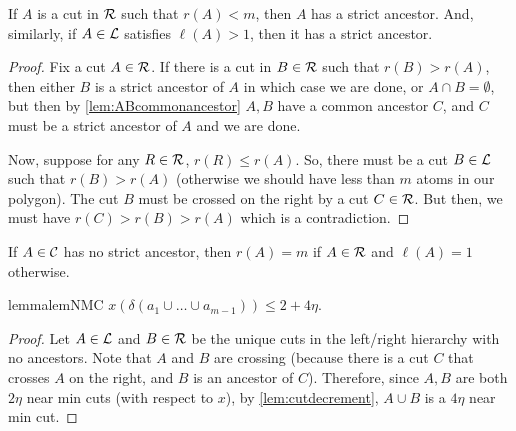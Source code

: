 \begin{lemma}\label{lem:strictparentexists}
If $A$ is a cut in ${\cal R}$ such that $r(A)<m$, then $A$ has a strict ancestor. And, similarly, if $A\in{\cal L}$ satisfies $\ell(A)>1$, then it has a strict ancestor.
\end{lemma}
\begin{proof}
Fix a cut $A\in {\cal R}$. If there is a cut in $B\in {\cal R}$ such that $r(B)>r(A)$, then either $B$ is a strict ancestor of $A$ in which case we are done, or $A\cap B=\emptyset$, but then by \cref{lem:ABcommonancestor} $A,B$ have a common ancestor $C$, and $C$ must be a strict ancestor of $A$ and we are done.

Now, suppose for any $R\in {\cal R}$, $r(R)\leq r(A)$. So, there must be a cut $B\in {\cal L}$ such that $r(B)>r(A)$ (otherwise we should have less than $m$ atoms in our polygon). The cut $B$ must be crossed on the right by a cut $C\in {\cal R}$. But then, we must have $r(C)>r(B)>r(A)$ which is a contradiction. 
\end{proof}


\begin{corollary}\label{cor:leftmostrightmostancestor}
	If $A\in {\cal C}$ has no strict ancestor, then $r(A)=m$ if $A\in {\cal R}$ and $\ell(A)=1$ otherwise.
\end{corollary}


\begin{restatable}{lemma}{lemNMC}\label{lem:NMC}
$x(\delta(a_1\cup\dots\cup a_{m-1}))\leq 2+4\eta.$ 
\end{restatable}
\begin{proof}
	Let $A\in {\cal L}$ and $B\in {\cal R}$ be the unique cuts in the left/right  hierarchy with no ancestors. Note that $A$ and $B$ are crossing (because there is a cut $C$ that crosses $A$ on the right, and $B$ is an ancestor of $C$). Therefore, since $A,B$ are both $2\eta$ near min cuts (with respect to $x$), by \cref{lem:cutdecrement}, $A\cup B$ is a $4\eta$ near min cut.
\end{proof} 


